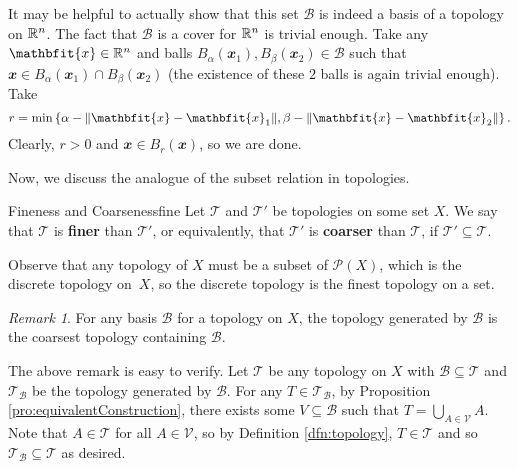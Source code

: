 \documentclass[math, code]{amznotes}
\theoremstyle{remark}
\newtheorem*{remark}{Remark}
\begin{document}
It may be helpful to actually show that this set $\mathcal{B}$ is indeed a basis of a topology on $\mathbb{R}^n$. The fact that $\mathcal{B}$ is a cover for $\mathbb{R}^n$ is trivial enough. Take any $\mathbfit{x} \in \R^n$ and balls $B_{\alpha}\left(\mathbfit{x}_1\right), B_{\beta}\left(\mathbfit{x}_2\right) \in \mathcal{B}$ such that $\mathbfit{x} \in B_{\alpha}\left(\mathbfit{x}_1\right) \cap B_{\beta}\left(\mathbfit{x}_2\right)$ (the existence of these $2$ balls is again trivial enough). Take 
\begin{equation*}
    r = \min\left\{\alpha - \norm{\mathbfit{x} - \mathbfit{x}_1}, \beta - \norm{\mathbfit{x} - \mathbfit{x}_2}\right\}.
\end{equation*}
Clearly, $r > 0$ and $\mathbfit{x} \in B_r\left(\mathbfit{x}\right)$, so we are done.

Now, we discuss the analogue of the subset relation in topologies.
\begin{dfnbox}{Fineness and Coarseness}{fine}
    Let $\mathcal{T}$ and $\mathcal{T}'$ be topologies on some set $X$. We say that $\mathcal{T}$ is {\color{red} \textbf{finer}} than $\mathcal{T}'$, or equivalently, that $\mathcal{T}'$ is {\color{red} \textbf{coarser}} than $\mathcal{T}$, if $\mathcal{T}' \subseteq \mathcal{T}$.
\end{dfnbox}
Observe that any topology of $X$ must be a subset of $\mathcal{P}\left(X\right)$, which is the discrete topology on~$X$, so the discrete topology is the finest topology on a set.
\begin{notebox}
    \begin{remark}
        For any basis $\mathcal{B}$ for a topology on $X$, the topology generated by $\mathcal{B}$ is the coarsest topology containing $\mathcal{B}$.
    \end{remark}
\end{notebox}
The above remark is easy to verify. Let $\mathcal{T}$ be any topology on $X$ with $\mathcal{B} \subseteq \mathcal{T}$ and $\mathcal{T}_{\mathcal{B}}$ be the topology generated by $\mathcal{B}$. For any $T \in \mathcal{T}_{\mathcal{B}}$, by Proposition \ref{pro:equivalentConstruction}, there exists some $V \subseteq \mathcal{B}$ such that $T = \bigcup_{A \in \mathcal{V}}A$. Note that $A \in \mathcal{T}$ for all $A \in \mathcal{V}$, so by Definition \ref{dfn:topology}, $T \in \mathcal{T}$ and so $\mathcal{T}_{\mathcal{B}} \subseteq \mathcal{T}$ as desired.
\end{document}
